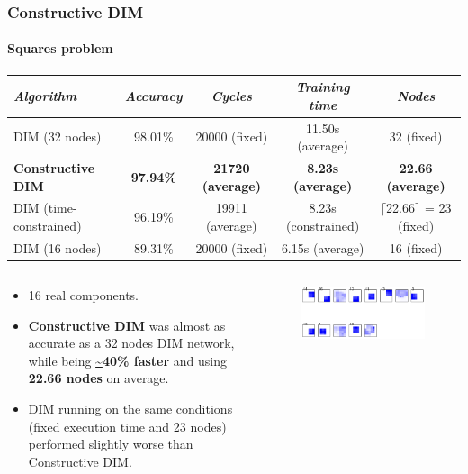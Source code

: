 \documentclass{beamer}
\begin{document}
			\begin{frame}
				\frametitle{Constructive DIM}
				\framesubtitle{Squares problem}
				\begin{table}[h]
					\centering
					\begin{adjustbox}{width=1\textwidth}
						\begin{tabular}{l*{4}{|c}}
							\emph{Algorithm}          & \emph{Accuracy}  & \emph{Cycles}            & \emph{Training time}     & \emph{Nodes}                       \\
							\hline
							DIM (32 nodes)            & 98.01\%          & 20000 (fixed)            & 11.50s (average)         & 32 (fixed)                         \\
							\textbf{Constructive DIM} & \textbf{97.94\%} & \textbf{21720 (average)} & \textbf{8.23s (average)} & \textbf{22.66 (average)}           \\
							DIM (time-constrained)    & 96.19\%          & 19911 (average)          & 8.23s (constrained)      & $\lceil$22.66$\rceil$ = 23 (fixed) \\
							DIM (16 nodes)            & 89.31\%          & 20000 (fixed)            & 6.15s (average)         & 16 (fixed)                          \\
						\end{tabular}
					\end{adjustbox}
				\end{table}
				\begin{columns}[c]
					\begin{small}
						\begin{itemize}
							\item 16 real components.
							\item \textbf{Constructive DIM} was almost as accurate as a 32 nodes DIM network, while being \textbf{\url{~}40\% faster} and using \textbf{22.66 nodes} on average.
							\item DIM running on the same conditions (fixed execution time and 23 nodes) performed slightly worse than Constructive DIM.
						\end{itemize}
					\end{small}
					\begin{figure}[h]
						\centering
						\includegraphics[width=\textwidth]{learning_squares}
					\end{figure}
				\end{columns}
			\end{frame}
\end{document}
